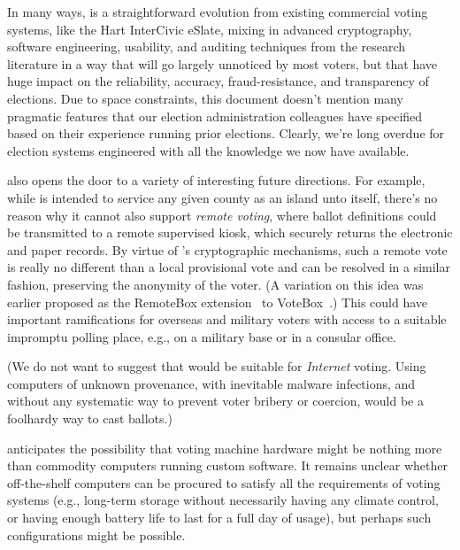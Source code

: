 \label{sec:future}
\label{sec:conclusion}

In many ways, \projname is a straightforward evolution from existing
commercial voting systems, like the Hart InterCivic eSlate, mixing in
advanced cryptography, software engineering, usability, and auditing
techniques from the research literature in a way that will go largely
unnoticed by most voters, but that have huge impact on the
reliability, accuracy, fraud-resistance, and transparency of
elections. Due to space constraints, this document doesn't 
mention many pragmatic features that our election
administration colleagues have specified based on their experience
running prior elections. Clearly, we're long overdue for election
systems engineered with all the knowledge we now have available.

\projname also opens the door to a variety of interesting future
directions. 
For example, while \projname is intended to service any
given county as an island unto itself, there's no reason why it cannot
also support {\em remote voting}, where ballot definitions could be
transmitted to a remote supervised kiosk, which securely returns the electronic and paper records.
By virtue of \projname's cryptographic mechanisms, such a remote
vote is really no different than a local provisional vote and can be
resolved in a similar fashion, preserving the anonymity of the
voter. (A variation on this idea was earlier proposed as the RemoteBox
extension~\cite{remotebox08} to VoteBox~\cite{sandler08votebox}.)
This could have important ramifications for overseas and military
voters with access to a suitable impromptu polling place, e.g., on a
military base or in a consular office.

(We do not want to suggest that \projname
would be suitable for {\em Internet} voting. Using computers of
unknown provenance, with inevitable malware infections, and
without any systematic way to prevent voter bribery or coercion,
would be a foolhardy way to cast ballots.)

\projname anticipates the possibility that voting machine
hardware might be nothing more than commodity computers running custom
software. It remains unclear whether off-the-shelf computers can be
procured to satisfy all the requirements of voting systems (e.g.,
long-term storage without necessarily having any climate control, or
having enough battery life to last for a full day of usage), but
perhaps such configurations might be possible.



